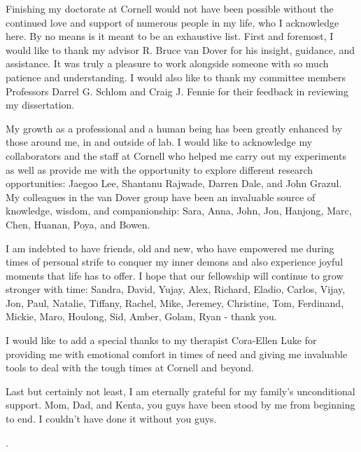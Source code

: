 \documentclass[phd,tocprelim,cornellheadings,final,]{cornell}
\begin{document}
\begin{acknowledgements}
Finishing my doctorate at Cornell would not have been possible without the continued love and support of numerous people in my life, who I acknowledge here. By no means is it meant to be an exhaustive list. First and foremost, I would like to thank my advisor R. Bruce van Dover for his insight, guidance, and assistance. It was truly a pleasure to work alongside someone with so much patience and understanding. I would also like to thank my committee members Professors Darrel G. Schlom and Craig J. Fennie for their feedback in reviewing my dissertation. 

My growth as a professional and a human being has been greatly enhanced by those around me, in and outside of lab. I would like to acknowledge my collaborators and the staff at Cornell who helped me carry out my experiments as well as provide me with the opportunity to explore different research opportunities: Jaegoo Lee, Shantanu Rajwade, Darren Dale, and John Grazul. My colleagues in the van Dover group have been an invaluable source of knowledge, wisdom, and companionship: Sara, Anna, John, Jon, Hanjong, Marc, Chen, Huanan, Poya, and Bowen. 

I am indebted to have friends, old and new, who have empowered me during times of personal strife to conquer my inner demons and also experience joyful moments that life has to offer. I hope that our fellowship will continue to grow stronger with time:  Sandra, David, Yujay, Alex, Richard, Eladio, Carlos, Vijay, Jon, Paul, Natalie, Tiffany, Rachel, Mike, Jeremey, Christine, Tom, Ferdinand, Mickie, Maro, Houlong, Sid, Amber, Golam, Ryan - thank you. 

I would like to add a special thanks to my therapist Cora-Ellen Luke for providing me with emotional comfort in times of need and giving me invaluable tools to deal with the tough times at Cornell and beyond. 

Last but certainly not least, I am eternally grateful for my family's unconditional support. Mom, Dad, and Kenta, you guys have been stood by me from beginning to end. I couldn't have done it without you guys. 
\end{acknowledgements}

\contentspage.
\tablelistpage
\figurelistpage
\normalspacing \setcounter{page}{1} 
\pagestyle{cornell} \addtolength{\parskip}{0.5\baselineskip}


     













\end{document}
